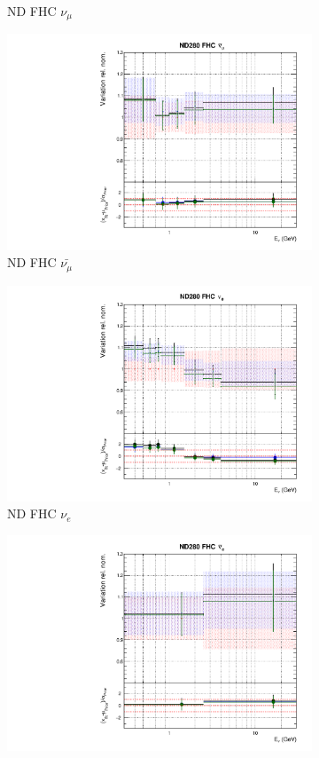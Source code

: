 \begin{figure}[!htbp]
\begin{subfigure}{0.45\textwidth}
  \caption{ND FHC $\nu_{\mu}$}
\end{subfigure}
\begin{subfigure}{0.45\textwidth}
  \centering
  \includegraphics[width=0.75\linewidth]{figs/polydataflux_1}
  \caption{ND FHC $\bar{\nu_{\mu}}$}
\end{subfigure}
\begin{subfigure}{0.45\textwidth}
  \centering
  \includegraphics[width=0.75\linewidth]{figs/polydataflux_2}
  \caption{ND FHC $\nu_e$}
\end{subfigure}
\begin{subfigure}{0.45\textwidth}
  \centering
  \includegraphics[width=0.75\linewidth]{figs/polydataflux_3}

\end{subfigure}
\end{figure}
